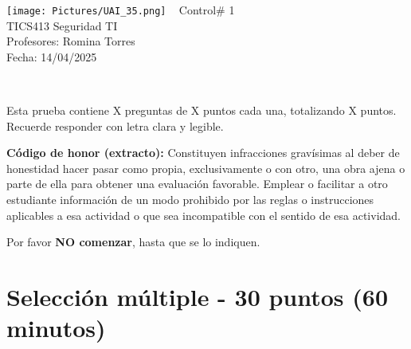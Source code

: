 \documentclass[a4paper]{article}
\begin{document}
\begin{center}
    \vspace*{-2cm}
    \texttt{[image: Pictures/UAI\_35.png]} \
    \vspace{0.5cm} %
    Control\# 1 \\
    TICS413 Seguridad TI \\
    Profesores: Romina Torres \\
    Fecha: 14/04/2025
\end{center}

\vspace{0.6cm}

\begin{flushleft}
     \\
    \medskip
\end{flushleft}
Esta prueba contiene X preguntas de X puntos cada una,  totalizando X puntos. Recuerde responder con letra clara y legible.


\vspace{1cm} 
\textbf{Código de honor (extracto):} Constituyen infracciones gravísimas al deber de honestidad hacer pasar como propia, exclusivamente o con otro, una obra ajena o parte de ella para obtener una evaluación favorable. Emplear o facilitar a otro estudiante información de un modo prohibido por las reglas o instrucciones aplicables a esa actividad o que sea incompatible con el sentido de esa actividad.

Por favor \textbf{NO comenzar}, hasta que se lo indiquen.


\section*{Selección múltiple - 30 puntos (60 minutos)}
\end{document}
